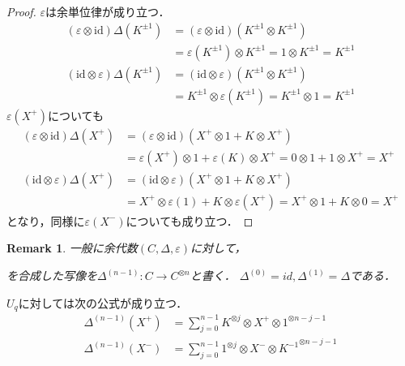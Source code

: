 \documentclass[10pt,dvipdfm]{beamer}
\newtheorem{remark}{Remark}
\begin{document}
  \begin{frame}
    \begin{proof}
      $\varepsilon$は余単位律が成り立つ．
      \begin{align*}
        (\varepsilon\otimes\text{id})\Delta(K^{\pm1}) &= (\varepsilon\otimes\text{id})(K^{\pm1}\otimes K^{\pm1})\\
        &= \varepsilon(K^{\pm1})\otimes K^{\pm1}= 1\otimes K^{\pm1}= K^{\pm1}\\
        (\text{id}\otimes\varepsilon)\Delta(K^{\pm1}) &= (\text{id}\otimes\varepsilon)(K^{\pm1}\otimes K^{\pm1})\\
        &= K^{\pm1}\otimes \varepsilon(K^{\pm1})= K^{\pm1}\otimes 1= K^{\pm1}
      \end{align*}
      $\varepsilon(X^+)$についても
      \begin{align*}
        (\varepsilon\otimes\text{id})\Delta(X^+) &= (\varepsilon\otimes\text{id})(X^+\otimes 1 + K\otimes X^+)\\
        &= \varepsilon(X^+)\otimes 1 + \varepsilon(K)\otimes X^+= 0\otimes 1 + 1\otimes X^+= X^+\\
        (\text{id}\otimes\varepsilon)\Delta(X^+) &= (\text{id}\otimes\varepsilon)(X^+\otimes 1 + K\otimes X^+)\\
        &= X^+\otimes \varepsilon(1) + K\otimes \varepsilon(X^+)= X^+\otimes 1 + K\otimes 0= X^+
      \end{align*}
      となり，同様に$\varepsilon(X^-)$についても成り立つ．
    \end{proof}
  \end{frame}
  \begin{frame}
    \begin{remark}
      一般に余代数$(C,\Delta,\varepsilon)$に対して，
      \begin{center}
      \end{center}
      を合成した写像を$\Delta^{(n-1)}:C\to C^{\otimes n}$と書く．
      $\Delta^{(0)}=id,\Delta^{(1)}=\Delta$である．
    \end{remark}
    $U_q$に対しては次の公式が成り立つ．
    \begin{align*}
      \Delta^{(n-1)}(X^+) &= \sum_{j=0}^{n-1}K^{\otimes j}\otimes X^+\otimes 1^{\otimes n-j-1}\\
      \Delta^{(n-1)}(X^-) &= \sum_{j=0}^{n-1}1^{\otimes j}\otimes X^-\otimes {K^{-1}}^{\otimes n-j-1}
    \end{align*}
  \end{frame}
\end{document}
